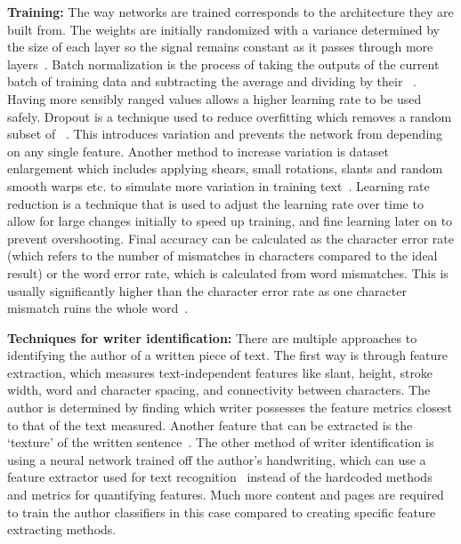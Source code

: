 \textbf{Training:} The way networks are trained corresponds to the architecture they are built from. The weights are initially randomized with a variance determined by the size of each layer so the signal remains constant as it passes through more layers~\cite{he2015}. Batch normalization is the process of taking the outputs of the current batch of training data and subtracting the average and dividing by their ~\cite[Alg.~1]{ioffe2015}. Having more sensibly ranged values allows a higher learning rate to be used safely. Dropout is a technique used to reduce overfitting which removes a random subset of ~\cite[p.~1930]{srivastava2014}. This introduces variation and prevents the network from depending on any single feature. Another method to increase variation is dataset enlargement which includes applying shears, small rotations, slants and random smooth warps etc. to simulate more variation in training text~\cite{simard2003}. Learning rate reduction is a technique that is used to adjust the learning rate over time to allow for large changes initially to speed up training, and fine learning later on to prevent overshooting. Final accuracy can be calculated as the character error rate (which refers to the number of mismatches in characters compared to the ideal result) or the word error rate, which is calculated from word mismatches. This is usually significantly higher than the character error rate as one character mismatch ruins the whole word~\cite[p.~1]{kizilirmak2023}.

\textbf{Techniques for writer identification:} There are multiple approaches to identifying the author of a written piece of text. The first way is through feature extraction, which measures text-independent features like slant, height, stroke width, word and character spacing, and connectivity between characters. The author is determined by finding which writer possesses the feature metrics closest to that of the text measured. Another feature that can be extracted is the  `texture' of the written sentence~\cite{bulacu2007}. The other method of writer identification is using a neural network trained off the author's handwriting, which can use a feature extractor used for text recognition~\cite{ma2023} instead of the hardcoded methods and metrics for quantifying features. Much more content and pages are required to train the author classifiers in this case compared to creating specific feature extracting methods.

